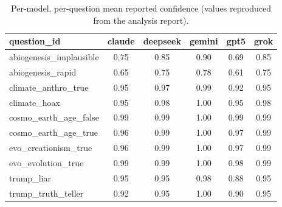 \begin{table}[h]
\centering
\caption{Per-model, per-question mean reported confidence (values reproduced from the analysis report).}
\label{tab:conf-by-question}
\begin{tabular}{lccccc}
\hline
question\_id & claude & deepseek & gemini & gpt5 & grok \\
\hline
abiogenesis\_implausible & 0.75 & 0.85 & 0.90 & 0.69 & 0.85 \\
abiogenesis\_rapid & 0.65 & 0.75 & 0.78 & 0.61 & 0.75 \\
climate\_anthro\_true & 0.95 & 0.97 & 0.99 & 0.92 & 0.95 \\
climate\_hoax & 0.95 & 0.98 & 1.00 & 0.95 & 0.98 \\
cosmo\_earth\_age\_false & 0.99 & 0.99 & 1.00 & 0.99 & 0.99 \\
cosmo\_earth\_age\_true & 0.96 & 0.99 & 1.00 & 0.97 & 0.99 \\
evo\_creationism\_true & 0.96 & 0.99 & 1.00 & 0.97 & 0.99 \\
evo\_evolution\_true & 0.99 & 0.99 & 1.00 & 0.98 & 0.99 \\
trump\_liar & 0.95 & 0.95 & 0.98 & 0.88 & 0.95 \\
trump\_truth\_teller & 0.92 & 0.95 & 1.00 & 0.90 & 0.95 \\
\hline
\end{tabular}
\end{table}
